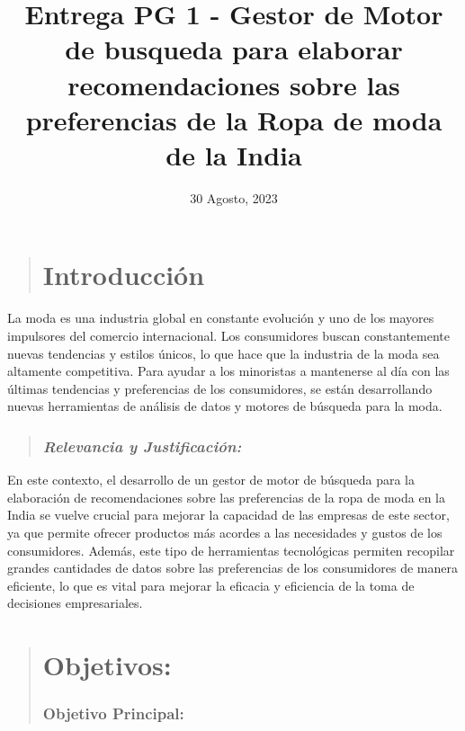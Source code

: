 \documentclass[
]{article}
\title{Entrega PG 1 - Gestor de Motor de busqueda para elaborar
recomendaciones sobre las preferencias de la Ropa de moda de la India}
\author{}
\date{\vspace{-2.5em}30 Agosto, 2023}
\begin{document}
\maketitle

{
\setcounter{tocdepth}{5}
\tableofcontents
}
\begin{quote}
\hypertarget{introducciuxf3n}{%
\section{\texorpdfstring{\textbf{Introducción}}{Introducción}}\label{introducciuxf3n}}
\end{quote}

La moda es una industria global en constante evolución y uno de los
mayores impulsores del comercio internacional. Los consumidores buscan
constantemente nuevas tendencias y estilos únicos, lo que hace que la
industria de la moda sea altamente competitiva. Para ayudar a los
minoristas a mantenerse al día con las últimas tendencias y preferencias
de los consumidores, se están desarrollando nuevas herramientas de
análisis de datos y motores de búsqueda para la moda.

\begin{quote}
\hypertarget{relevancia-y-justificaciuxf3n}{%
\subsubsection{\texorpdfstring{\textbf{\emph{Relevancia y
Justificación:}}}{Relevancia y Justificación:}}\label{relevancia-y-justificaciuxf3n}}
\end{quote}

En este contexto, el desarrollo de un gestor de motor de búsqueda para
la elaboración de recomendaciones sobre las preferencias de la ropa de
moda en la India se vuelve crucial para mejorar la capacidad de las
empresas de este sector, ya que permite ofrecer productos más acordes a
las necesidades y gustos de los consumidores. Además, este tipo de
herramientas tecnológicas permiten recopilar grandes cantidades de datos
sobre las preferencias de los consumidores de manera eficiente, lo que
es vital para mejorar la eficacia y eficiencia de la toma de decisiones
empresariales.

\begin{quote}
\hypertarget{objetivos}{%
\section{\texorpdfstring{\textbf{Objetivos:}}{Objetivos:}}\label{objetivos}}

\hypertarget{objetivo-principal}{%
\subsubsection{\texorpdfstring{\textbf{Objetivo
Principal:}}{Objetivo Principal:}}\label{objetivo-principal}}
\end{quote}
\end{document}
